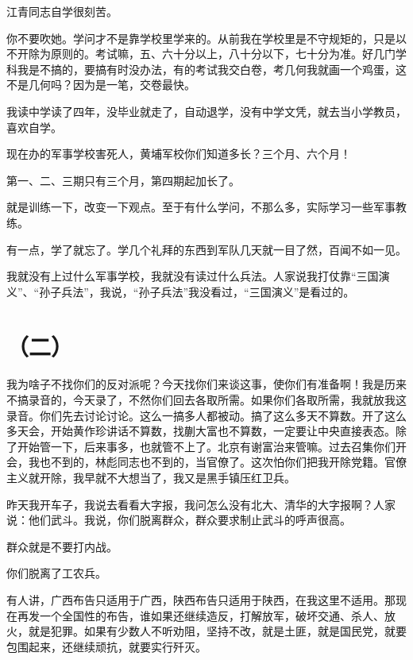 江青同志自学很刻苦。

你不要吹她。学问才不是靠学校里学来的。从前我在学校里是不守规矩的，只是以不开除为原则的。考试嘛，五、六十分以上，八十分以下，七十分为准。好几门学科我是不搞的，要搞有时没办法，有的考试我交白卷，考几何我就画一个鸡蛋，这不是几何吗？因为是一笔，交卷最快。

我读中学读了四年，没毕业就走了，自动退学，没有中学文凭，就去当小学教员，喜欢自学。

现在办的军事学校害死人，黄埔军校你们知道多长？三个月、六个月！

第一、二、三期只有三个月，第四期起加长了。

就是训练一下，改变一下观点。至于有什么学问，不那么多，实际学习一些军事教练。

有一点，学了就忘了。学几个礼拜的东西到军队几天就一目了然，百闻不如一见。

我就没有上过什么军事学校，我就没有读过什么兵法。人家说我打仗靠“三国演义”、“孙子兵法”，我说，“孙子兵法”我没看过，“三国演义”是看过的。

\section*{（二）}

我为啥子不找你们的反对派呢？今天找你们来谈这事，使你们有准备啊！我是历来不搞录音的，今天录了，不然你们回去各取所需。如果你们各取所需，我就放我这录音。你们先去讨论讨论。这么一搞多人都被动。搞了这么多天不算数。开了这么多天会，开始黄作珍讲话不算数，找蒯大富也不算数，一定要让中央直接表态。除了开始管一下，后来事多，也就管不上了。北京有谢富治来管嘛。过去召集你们开会，我也不到的，林彪同志也不到的，当官僚了。这次怕你们把我开除党籍。官僚主义就开除，我早就不大想当了，我又是黑手镇压红卫兵。

昨天我开车子，我说去看看大字报，我问怎么没有北大、清华的大字报啊？人家说：他们武斗。我说，你们脱离群众，群众要求制止武斗的呼声很高。

群众就是不要打内战。

你们脱离了工农兵。

有人讲，广西布告只适用于广西，陕西布告只适用于陕西，在我这里不适用。那现在再发一个全国性的布告，谁如果还继续造反，打解放军，破坏交通、杀人、放火，就是犯罪。如果有少数人不听劝阻，坚持不改，就是土匪，就是国民党，就要包围起来，还继续顽抗，就要实行歼灭。

